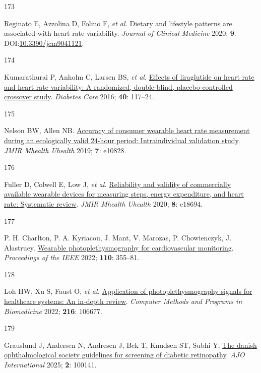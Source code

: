 \documentclass[
  a4paper,
  headsepline=true,
  open=left]{scrbook}
\newlength{\cslhangindent}
\newlength{\csllabelwidth}
\newlength{\cslentryspacingunit} %
\newenvironment{CSLReferences}[2] %
 {%
  \setlength{\parindent}{0pt}
  \ifodd #1
  \let\oldpar\par
  \def\par{\hangindent=\cslhangindent\oldpar}
  \fi
  \setlength{\parskip}{#2\cslentryspacingunit}
 }%
 {}
\newcommand{\CSLLeftMargin}[1]{\parbox[t]{\csllabelwidth}{#1}}
\newcommand{\CSLRightInline}[1]{\parbox[t]{\linewidth - \csllabelwidth}{#1}\break}
\begin{document}
\begin{CSLReferences}{0}{0}
\leavevmode{}%
\CSLLeftMargin{173 }%
\CSLRightInline{Reginato E, Azzolina D, Folino F, \emph{et al.} Dietary
and lifestyle patterns are associated with heart rate variability.
\emph{Journal of Clinical Medicine} 2020; \textbf{9}.
DOI:\href{https://doi.org/10.3390/jcm9041121}{10.3390/jcm9041121}.}

\leavevmode{}%
\CSLLeftMargin{174 }%
\CSLRightInline{Kumarathurai P, Anholm C, Larsen BS, \emph{et al.}
\href{https://doi.org/10.2337/dc16-1580}{Effects of liraglutide on heart
rate and heart rate variability: A randomized, double-blind,
placebo-controlled crossover study}. \emph{Diabetes Care} 2016;
\textbf{40}: 117--24.}

\leavevmode{}%
\CSLLeftMargin{175 }%
\CSLRightInline{Nelson BW, Allen NB.
\href{https://doi.org/10.2196/10828}{Accuracy of consumer wearable heart
rate measurement during an ecologically valid 24-hour period:
Intraindividual validation study}. \emph{JMIR Mhealth Uhealth} 2019;
\textbf{7}: e10828.}

\leavevmode{}%
\CSLLeftMargin{176 }%
\CSLRightInline{Fuller D, Colwell E, Low J, \emph{et al.}
\href{https://doi.org/10.2196/18694}{Reliability and validity of
commercially available wearable devices for measuring steps, energy
expenditure, and heart rate: Systematic review}. \emph{JMIR Mhealth
Uhealth} 2020; \textbf{8}: e18694.}

\leavevmode{}%
\CSLLeftMargin{177 }%
\CSLRightInline{P. H. Charlton, P. A. Kyriacou, J. Mant, V. Marozas, P.
Chowienczyk, J. Alastruey.
\href{https://doi.org/10.1109/JPROC.2022.3149785}{Wearable
photoplethysmography for cardiovascular monitoring}. \emph{Proceedings
of the IEEE} 2022; \textbf{110}: 355--81.}

\leavevmode{}%
\CSLLeftMargin{178 }%
\CSLRightInline{Loh HW, Xu S, Faust O, \emph{et al.}
\href{https://doi.org/10.1016/j.cmpb.2022.106677}{Application of
photoplethysmography signals for healthcare systems: An in-depth
review}. \emph{Computer Methods and Programs in Biomedicine} 2022;
\textbf{216}: 106677.}

\leavevmode{}%
\CSLLeftMargin{179 }%
\CSLRightInline{Grauslund J, Andersen N, Andresen J, Bek T, Knudsen ST,
Subhi Y. \href{https://doi.org/10.1016/j.ajoint.2025.100141}{The danish
ophthalmological society guidelines for screening of diabetic
retinopathy}. \emph{AJO International} 2025; \textbf{2}: 100141.}


\end{CSLReferences}
\end{document}
